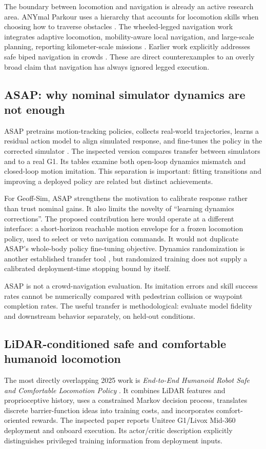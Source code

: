 \documentclass[11pt,a4paper]{article}
\begin{document}
The boundary between locomotion and navigation is already an active research
area. ANYmal Parkour uses a hierarchy that accounts for locomotion skills
when choosing how to traverse obstacles \citep{parkour}. The wheeled-legged
navigation work integrates adaptive locomotion, mobility-aware local
navigation, and large-scale planning, reporting kilometer-scale missions
\citep{wheeledleg}. Earlier work explicitly addresses safe biped navigation
in crowds \citep{biped2016}. These are direct counterexamples to an overly
broad claim that navigation has always ignored legged execution.

\subsection{ASAP: why nominal simulator dynamics are not enough}
ASAP pretrains motion-tracking policies, collects real-world trajectories,
learns a residual action model to align simulated response, and fine-tunes
the policy in the corrected simulator \citep{asap}. The inspected version
compares transfer between simulators and to a real G1. Its tables examine
both open-loop dynamics mismatch and closed-loop motion imitation.
This separation is important: fitting transitions and improving a deployed
policy are related but distinct achievements.

For Geoff-Sim, ASAP strengthens the motivation to calibrate response rather
than trust nominal gains. It also limits the novelty of ``learning dynamics
corrections''. The proposed contribution here would operate at a different
interface: a short-horizon reachable motion envelope for a frozen locomotion
policy, used to select or veto navigation commands. It would not duplicate
ASAP's whole-body policy fine-tuning objective. Dynamics randomization is
another established transfer tool \citep{domain}, but randomized training
does not supply a calibrated deployment-time stopping bound by itself.

ASAP is not a crowd-navigation evaluation. Its imitation errors and skill
success rates cannot be numerically compared with pedestrian collision or
waypoint completion rates. The useful transfer is methodological: evaluate
model fidelity and downstream behavior separately, on held-out conditions.

\subsection{LiDAR-conditioned safe and comfortable humanoid locomotion}
The most directly overlapping 2025 work is \emph{End-to-End Humanoid Robot
Safe and Comfortable Locomotion Policy} \citep{safehumanoid}. It combines
LiDAR features and proprioceptive history, uses a constrained Markov decision
process, translates discrete barrier-function ideas into training costs,
and incorporates comfort-oriented rewards. The inspected paper reports
Unitree G1/Livox Mid-360 deployment and onboard execution. Its actor/critic
description explicitly distinguishes privileged training information from
deployment inputs.
\end{document}

